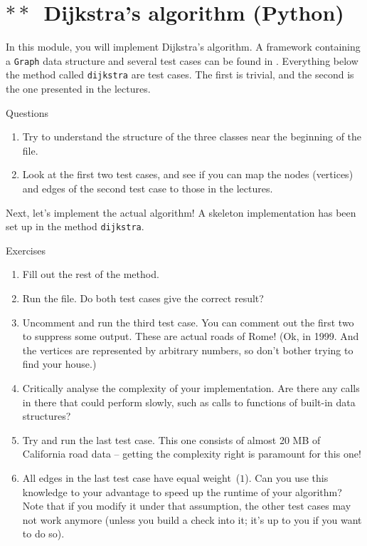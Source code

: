 \documentclass[12pt]{article}
\begin{document}
\clearpage
\section{$\ast\ast$~Dijkstra's algorithm (Python)}

In this module, you will implement Dijkstra's algorithm. A framework containing a \texttt{Graph} data structure and several test cases can be found in . Everything below the method called \texttt{dijkstra} are test cases. The first is trivial, and the second is the one presented in the lectures.
%
\begin{mybox}{Questions}
    \begin{enumerate}
        \item Try to understand the structure of the three classes near the beginning of the file.
        \item Look at the first two test cases, and see if you can map the nodes (vertices) and edges of the second test case to those in the lectures.
    \end{enumerate}
\end{mybox}

Next, let's implement the actual algorithm! A skeleton implementation has been set up in the method \texttt{dijkstra}.
%
\begin{mybox}{Exercises}
    \begin{enumerate}
        \item Fill out the rest of the method.
        \item Run the file. Do both test cases give the correct result?
        \item Uncomment and run the third test case. You can comment out the first two to suppress some output. These are actual roads of Rome! (Ok, in 1999. And the vertices are represented by arbitrary numbers, so don't bother trying to find your house.)
        \item Critically analyse the complexity of your implementation. Are there any calls in there that could perform slowly, such as calls to functions of built-in data structures?
        \item Try and run the last test case. This one consists of almost 20 MB of California road data -- getting the complexity right is paramount for this one!
        \item All edges in the last test case have equal weight~($1$). Can you use this knowledge to your advantage to speed up the runtime of your algorithm? Note that if you modify it under that assumption, the other test cases may not work anymore (unless you build a check into it; it's up to you if you want to do so).
    \end{enumerate}
\end{mybox}
\end{document}
